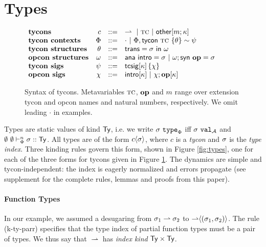 \documentclass[pldi]{sigplanconf-pldi15}
\newcommand{\rulename}[1]{(#1)}
\begin{document}
\section{Types}\label{types}


\begin{figure}[t]
\small
$\begin{array}{lrcl}
\textbf{tycons} & c & ::= & \rightharpoonup ~|~ \textsc{tc} ~|~ {\sf other}[m; \kappa]\\
\textbf{tycon contexts} & \Phi & ::= & \cdot ~|~ \Phi, {\sf tycon}~\textsc{tc} ~\{\theta\} \sim \psi\\
\textbf{tycon structures} & \theta & ::= & {\sf trans}=\sigma~{\sf in}~\omega \\
\textbf{opcon structures} & \omega & ::= & {\sf ana}~{\sf intro}=\sigma ~|~ \omega; {\sf syn}~\textbf{op}=\sigma\\
\textbf{tycon sigs} & \psi & ::= & {\sf tcsig}[\kappa]\,\{\chi\}\\
\textbf{opcon sigs}& \chi & ::= & {\sf intro}[\kappa] ~|~ \chi; \textbf{op}[\kappa]\\
\end{array}$
\caption{Syntax of tycons. Metavariables $\textsc{tc}$, $\textbf{op}$ and $m$ range over extension tycon and opcon names and natural numbers, respectively. We omit leading $\cdot$ in examples.}
\label{syntax-TC}\vspace{-8px}
\end{figure}

\noindent
Types are static values of kind ${\sf Ty}$, i.e. we write $\sigma~\mathtt{type}_{\Phi}$  iff $\sigma~\mathtt{val}_{\mathcal{A}}$ and $\emptyset~\emptyset \vdash_{\Phi}^{n} \sigma :: {\sf Ty}$. All types are of the form ${c}\langle\sigma\rangle$, where $c$ is a \emph{tycon} and $\sigma$ is the \emph{type index}. Three kinding rules govern this form, shown in Figure \ref{fig:types}, one for each of the three forms for tycons given in Figure \ref{syntax-TC}.  The dynamics are simple and tycon-independent: the index is eagerly normalized and errors propagate (see supplement for the complete rules, lemmas and proofs from this paper). 

\paragraph{Function Types} In our example, we assumed a desugaring from $\sigma_1 \rightharpoonup \sigma_2$ to ${\rightharpoonup}\langle(\sigma_1, \sigma_2)\rangle$. The rule \rulename{k-ty-parr} specifies that the type index of partial function types must be a pair of types. We thus say that $\rightharpoonup$ has \emph{index kind} ${\sf Ty} \times {\sf Ty}$. %
\end{document}
